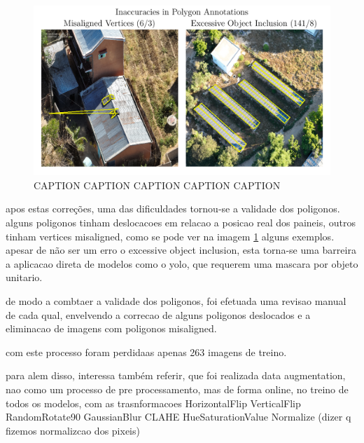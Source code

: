 \documentclass[conference]{IEEEtran}
\begin{document}
\begin{figure}[H]
    \centering
    \includegraphics[width=1\linewidth]{assets/data_poly_problems.png}
    \caption{CAPTION CAPTION CAPTION CAPTION CAPTION}
    \label{fig:data_poly_problems}
\end{figure}

apos estas correções, uma das dificuldades tornou-se a validade dos poligonos. alguns poligonos tinham deslocacoes em relacao a posicao real dos paineis, outros tinham vertices misaligned, como se pode ver na imagem \ref{fig:data_poly_problems} alguns exemplos. apesar de não ser um erro o excessive object inclusion, esta torna-se uma barreira a aplicacao direta de modelos como o yolo, que requerem uma mascara por objeto unitario.

de modo a combtaer a validade dos poligonos, foi efetuada uma revisao manual de cada qual, envelvendo a correcao de alguns poligonos deslocados e a eliminacao de imagens com poligonos misaligned.


com este processo foram perdidaas apenas 263 imagens de treino.


para alem disso, interessa também referir, que foi realizada data augmentation, nao como um processo de pre processamento, mas de forma online, no treino de todos os modelos, com as trasnformacoes
HorizontalFlip
VerticalFlip
RandomRotate90
GaussianBlur
CLAHE
HueSaturationValue
Normalize (dizer q fizemos normalizcao dos pixeis)

\end{document}
